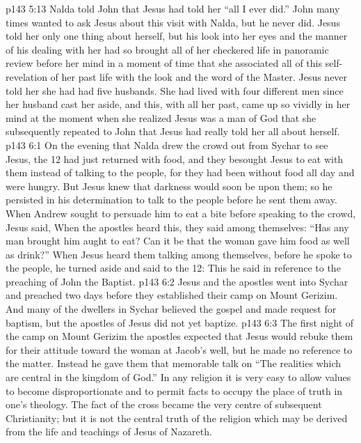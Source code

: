 \vs p143 5:13 Nalda told John that Jesus had told her “all I ever did.” John many times wanted to ask Jesus about this visit with Nalda, but he never did. Jesus told her only one thing about herself, but his look into her eyes and the manner of his dealing with her had so brought all of her checkered life in panoramic review before her mind in a moment of time that she associated all of this self\hyp{}revelation of her past life with the look and the word of the Master. Jesus never told her she had had five husbands. She had lived with four different men since her husband cast her aside, and this, with all her past, came up so vividly in her mind at the moment when she realized Jesus was a man of God that she subsequently repeated to John that Jesus had really told her all about herself.
\vs p143 6:1 On the evening that Nalda drew the crowd out from Sychar to see Jesus, the 12 had just returned with food, and they besought Jesus to eat with them instead of talking to the people, for they had been without food all day and were hungry. But Jesus knew that darkness would soon be upon them; so he persisted in his determination to talk to the people before he sent them away. When Andrew sought to persuade him to eat a bite before speaking to the crowd, Jesus said,  When the apostles heard this, they said among themselves: “Has any man brought him aught to eat? Can it be that the woman gave him food as well as drink?” When Jesus heard them talking among themselves, before he spoke to the people, he turned aside and said to the 12:  This he said in reference to the preaching of John the Baptist.
\vs p143 6:2 Jesus and the apostles went into Sychar and preached two days before they established their camp on Mount Gerizim. And many of the dwellers in Sychar believed the gospel and made request for baptism, but the apostles of Jesus did not yet baptize.
\vs p143 6:3 \pc The first night of the camp on Mount Gerizim the apostles expected that Jesus would rebuke them for their attitude toward the woman at Jacob’s well, but he made no reference to the matter. Instead he gave them that memorable talk on “The realities which are central in the kingdom of God.” In any religion it is very easy to allow values to become disproportionate and to permit facts to occupy the place of truth in one’s theology. The fact of the cross became the very centre of subsequent Christianity; but it is not the central truth of the religion which may be derived from the life and teachings of Jesus of Nazareth.
